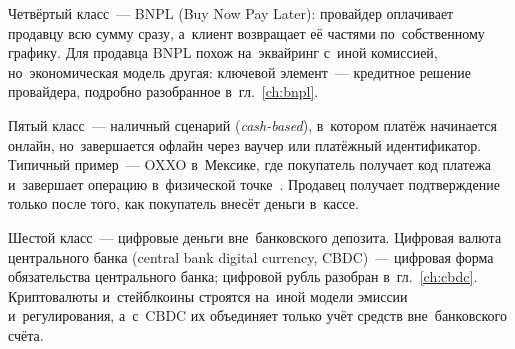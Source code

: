 Четвёртый класс~--- BNPL (Buy Now Pay Later): провайдер оплачивает продавцу всю
сумму сразу, а~клиент возвращает её частями по~собственному графику. Для
продавца BNPL похож на~эквайринг с~иной комиссией, но~экономическая модель
другая: ключевой элемент~--- кредитное решение провайдера, подробно разобранное
в~гл.~\ref{ch:bnpl}.

Пятый класс~--- наличный сценарий (\textit{cash-based}), в~котором платёж
начинается онлайн, но~завершается офлайн через ваучер или платёжный
идентификатор.
Типичный пример~--- OXXO в~Мексике, где покупатель получает код платежа
и~завершает операцию в~физической точке~\cite{oxxo-pay}. Продавец получает подтверждение только
после того, как покупатель внесёт деньги в~кассе.

Шестой класс~--- цифровые деньги вне~банковского депозита. Цифровая валюта
центрального банка (central bank digital currency, CBDC)~--- цифровая форма
обязательства центрального банка; цифровой рубль разобран в~гл.~\ref{ch:cbdc}.
Криптовалюты и~стейблкоины строятся на~иной модели эмиссии и~регулирования,
а~с~CBDC их объединяет только учёт средств вне~банковского счёта.

